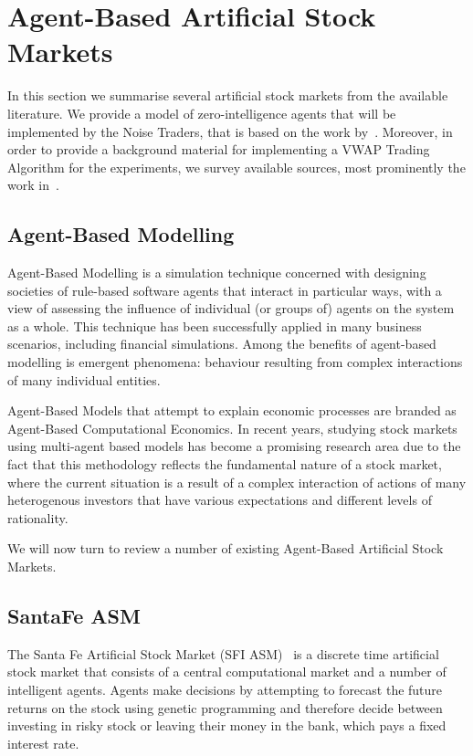 \section{Agent-Based Artificial Stock Markets}
\label{Chapters/Background/Agent-Based-Modelling}

In this section we summarise several artificial stock markets from the available literature. We provide a model of zero-intelligence agents that will be implemented by the Noise Traders, that is based on the work by~\citet[chap.~4]{Gilles2006}. Moreover, in order to provide a background material for implementing a VWAP Trading Algorithm for the experiments, we survey available sources, most prominently the work in~\cite{Coggins2006, Kakade2004}. 

\subsection{Agent-Based Modelling}
Agent-Based Modelling is a simulation technique concerned with designing societies of rule-based software agents that interact in particular ways, with a view of assessing the influence of individual (or groups of) agents on the system as a whole. This technique has been successfully applied in many business scenarios, including financial simulations. Among the benefits of agent-based modelling is emergent phenomena: behaviour resulting from complex interactions of many individual entities.

Agent-Based Models that attempt to explain economic processes are branded as Agent-Based Computational Economics. In recent years, studying stock markets using multi-agent based models has become a promising research area due to the fact that this methodology reflects the fundamental nature of a stock market, where the current situation is a result of a complex interaction of actions of many heterogenous investors that have various expectations and different levels of rationality.

We will now turn to review a number of existing Agent-Based Artificial Stock Markets.

\subsection{SantaFe ASM}
The Santa Fe Artificial Stock Market (SFI ASM)~\citep{Lebaron2002, Lebaron99} is a discrete time artificial stock market that consists of a central computational market and a number of intelligent agents. Agents make decisions by attempting to forecast the future returns on the stock using genetic programming and therefore decide between investing in risky stock or leaving their money in the bank, which pays a fixed interest rate.

